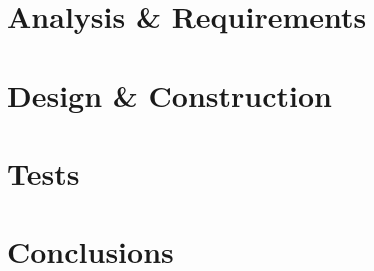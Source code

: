 %
\part{Analysis \& Requirements}\label{pt:analysis} \glsresetall

\part{Design \& Construction}\label{pt:design} 
 
%
\part{Tests}\label{pt:tests} 
\part{Conclusions}\label{pt:conclusions} 
%

